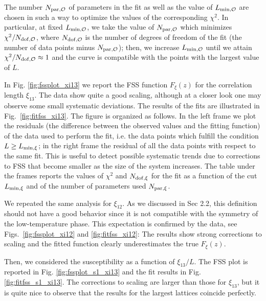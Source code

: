 \documentclass[12pt]{article}
\newcommand{\obs}{\mathcal{O}}
\newcommand{\text}{\rm}
\begin{document}
The number $N_{\text{par},\obs}$ of parameters in the fit as well as 
the value of $L_{\text{min},\obs}$ are chosen in such a way to optimize the 
values of the corresponding $\chi^2$. 
In particular, at fixed $L_{\text{min},\obs}$, we take the value of 
$N_{\text{par},\obs}$ which minimizes 
$\chi^2/N_{\text{dof},\obs}$, where $N_{\text{dof},\obs}$
is the number of degrees of freedom of the fit (the number of data
points minus $N_{\text{par},\obs}$); then, we increase $L_{\text{min},\obs}$
until we attain $\chi^2/N_{\text{dof},\obs} \approx 1$ and 
the curve is compatible with the points with the largest value of $L$.
   
In Fig. \ref{fig:fssplot_xi13} we report the FSS function 
$F_\xi(z)$ for the correlation length $\xi_{13}$. The data show quite a 
good scaling, although at a closer look one may observe some 
small systematic deviations. 
The results of the fits are illustrated in Fig.~\ref{fig:fitfss_xi13}.
The figure is 
organized as follows. In the left frame  we plot the
residuals (the difference between the observed values and the fitting
function)  of the data used to perform the fit, i.e. the 
data points which fulfill
the condition $L \ge L_{\text{min},\xi}$; in the right frame the residual of
all the data points with respect to the same fit. This is useful to detect
possible systematic trends due to 
corrections to FSS that become smaller as the size of the system increases. 
The table under the frames reports 
the values of $\chi^2$  and $N_{\text{dof},\xi}$ for the fit as a
function of the cut $L_{\text{min},\xi}$ and of the number of 
parameters used $N_{{\rm par},\xi}$.

We repeated the same analysis for $\xi_{12}$. As we discussed in Sec 2.2, 
this definition should not have a good behavior since it is not 
compatible with the symmetry of the low-temperature phase. 
This expectation is confirmed by the data, see
Figs.~\ref{fig:fssplot_xi12} and \ref{fig:fitfss_xi12}: 
The results show strong corrections to scaling 
and the fitted function clearly
underestimates the true $F_\xi(z)$. 

Then, we considered the susceptibility as a function of $\xi_{13}/L$. 
The FSS plot is reported in Fig. \ref{fig:fssplot_s1_xi13} 
and the  fit results in Fig. \ref{fig:fitfss_s1_xi13}. The corrections to scaling are 
larger than those for $\xi_{13}$, but it is quite nice to observe that 
the results for the largest lattices coincide perfectly. 
\end{document}
